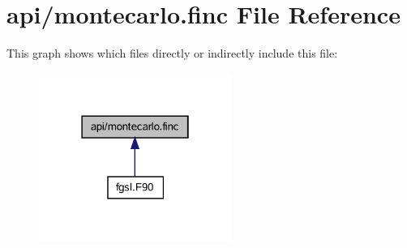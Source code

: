 \hypertarget{montecarlo_8finc}{}\section{api/montecarlo.finc File Reference}
\label{montecarlo_8finc}
This graph shows which files directly or indirectly include this file\+:\nopagebreak
\begin{figure}[H]
\begin{center}
\leavevmode
\includegraphics[width=178pt]{montecarlo_8finc__dep__incl}
\end{center}
\end{figure}
